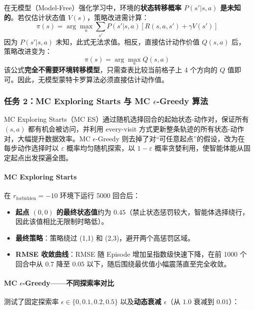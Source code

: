 \documentclass[11pt,a4paper,UTF8]{ctexart}
\numberwithin{figure}{section}
\numberwithin{table}{section}
\newcommand{\answerlabel}{%
  \par\smallskip\noindent{\heiti\bfseries 回答：}\quad}
\begin{document}
\answerlabel 在无模型（Model-Free）强化学习中，环境的\textbf{状态转移概率 $P(s'|s, a)$ 是未知的}。若仅估计状态值 $V(s)$，策略改进需计算：
$$\pi(s) = \arg\max_{a} \sum_{s'} P(s'|s, a) \left[ R(s, a, s') + \gamma V(s') \right]$$
因为 $P(s'|s,a)$ 未知，此式无法求值。相反，直接估计动作价值 $Q(s, a)$ 后，策略改进变为：
$$\pi(s) = \arg\max_{a} Q(s, a)$$
该公式\textbf{完全不需要环境转移模型}，只需查表比较当前格子上 4 个方向的 $Q$ 值即可。因此，无模型蒙特卡罗算法必须直接估计动作值。

\subsubsection{任务 2：MC Exploring Starts 与 MC $\epsilon$-Greedy 算法}

MC Exploring Starts（MC ES）通过随机选择回合的起始状态-动作对，保证所有 $(s,a)$ 都有机会被访问，并利用 every-visit 方式更新整条轨迹的所有状态-动作对，大幅提升数据效率。MC $\epsilon$-Greedy 则去掉了对``可任意起点''的假设，改为在每步动作选择时以 $\varepsilon$ 概率均匀随机探索，以 $1-\varepsilon$ 概率贪婪利用，使智能体能从固定起点出发探遍全图。

\paragraph{MC Exploring Starts}

在 $r_\text{forbidden} = -10$ 环境下运行 5000 回合后：
\begin{itemize}
\item \textbf{起点 $(0,0)$ 的最终状态值}约为 \textbf{$0.45$}（禁止状态惩罚较大，智能体选择绕行，因此该值相比无限制时略低）。
\item \textbf{最终策略}：策略绕过 (1,1) 和 (2,3)，避开两个高惩罚区域。
\item \textbf{RMSE 收敛曲线}：RMSE 随 Episode 增加呈指数级快速下降，在前 1000 个回合中从 $0.7$ 降至 $0.05$ 以下，随后围绕最优值小幅震荡直至完全收敛。
\end{itemize}

\paragraph{MC $\epsilon$-Greedy——不同探索率对比}

测试了固定探索率 $\epsilon \in \{0, 0.1, 0.2, 0.5\}$ 以及\textbf{动态衰减 $\epsilon$}（从 $1.0$ 衰减到 $0.01$）：
\end{document}

